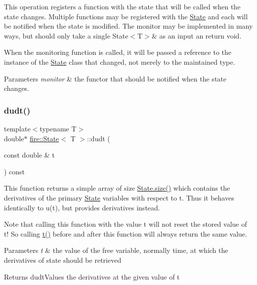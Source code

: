 This operation registers a function with the state that will be called when the state changes. Multiple functions may be registered with the \hyperlink{a00818}{State} and each will be notified when the state is modified. The monitor may be implemented in many ways, but should only take a single State$<$\+T$>$\& as an input an return void.

When the monitoring function is called, it will be passed a reference to the instance of the \hyperlink{a00818}{State} class that changed, not merely to the maintained type. 
\begin{DoxyParams}{Parameters}
{\em monitor} & the functor that should be notified when the state changes. \\
\hline
\end{DoxyParams}
\mbox{\label{a00818_a4d20304931607c1cb27358fb3776a620}} 
\subsubsection{\texorpdfstring{dudt()}{dudt()}}
{\footnotesize\ttfamily template$<$typename T$>$ \\
double$\ast$ \hyperlink{a00818}{fire\+::\+State}$<$ T $>$\+::dudt (\begin{DoxyParamCaption}\item[{const double \&}]{t }\end{DoxyParamCaption}) const\hspace{0.3cm}{\ttfamily [inline]}}

This function returns a simple array of size \hyperlink{a00818_a22b2d9e2feb153c819e90a4ac7ee8d72}{State.\+size()} which contains the derivatives of the primary \hyperlink{a00818}{State} variables with respect to t. Thus it behaves identically to u(t), but provides derivatives instead.

Note that calling this function with the value t will not reset the stored value of t! So calling \hyperlink{a00818_a5d8acc4d5bdd8942de10d34c55680349}{t()} before and after this function will always return the same value.


\begin{DoxyParams}{Parameters}
{\em t} & the value of the free variable, normally time, at which the derivatives of state should be retrieved \\
\hline
\end{DoxyParams}
\begin{DoxyReturn}{Returns}
dudt\+Values the derivatives at the given value of t 
\end{DoxyReturn}
\mbox{\label{a00818_a71cec682edafbf5c3b09e9d6dc91f12b}} 
